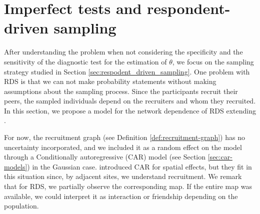 \section{Imperfect tests and respondent-driven sampling}

After understanding the problem when not considering the specificity and the
sensitivity of the diagnostic test for the estimation of $\theta$, we focus on
the sampling strategy studied in Section \ref{sec:respodent_driven_sampling}.
One problem with RDS is that we
can not make probability statements without making assumptions about the
sampling process. Since the participants recruit their peers, the sampled
individuals depend on the recruiters and whom they recruited. In this section,
we propose a model for the network dependence of RDS extending
\textcite{bastos2012binary}.

For now, the recruitment graph (see Definition  \ref{def:recruitment-graph})
has no uncertainty
incorporated, and we included it as a random effect on the model through a
Conditionally autoregressive (CAR) model (see Section \ref{sec:car-models}) in the Gaussian case.
\textcite{besag1974spatial} introduced
CAR for spatial effects, but they fit in this situation since, by
adjacent sites, we understand recruitment. We remark that for RDS, we
partially observe the corresponding map. If the entire map was available, we
could interpret it as interaction or friendship depending on the population.

